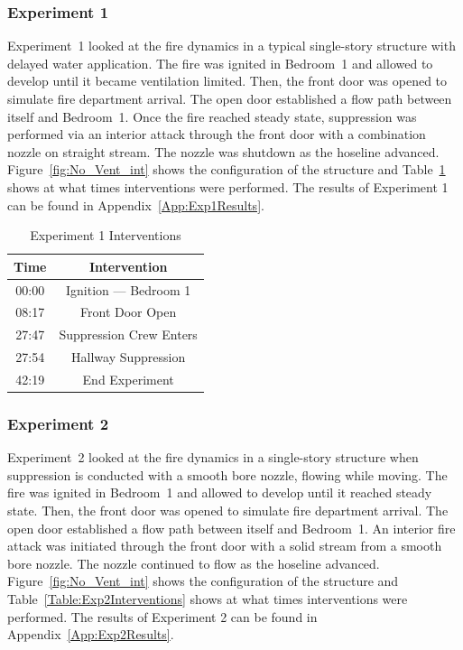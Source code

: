 \documentclass[12pt,oneside]{book}
\begin{document}
\subsubsection{Experiment 1}
Experiment~1 looked at the fire dynamics in a typical single-story structure with delayed water application. The fire was ignited in Bedroom~1 and allowed to develop until it became ventilation limited. Then, the front door was opened to simulate fire department arrival. The open door established a flow path between itself and Bedroom~1. Once the fire reached steady state, suppression was performed via an interior attack through the front door with a combination nozzle on straight stream. The nozzle was shutdown as the hoseline advanced. Figure~\ref{fig:No_Vent_int} shows the configuration of the structure and Table~\ref{Table:Exp1Interventions} shows at what times interventions were performed. The results of Experiment 1 can be found in Appendix~\ref{App:Exp1Results}. 


\begin{table}[!ht]
	\centering
	\caption{Experiment 1 Interventions}
	\begin{tabular}{|c|c|} 
		\hline
		Time & Intervention \\ \hline \hline
		00:00 & Ignition --- Bedroom 1 \\ \hline
		08:17 & Front Door Open \\ \hline
		27:47 & Suppression Crew Enters\\ \hline
		27:54 & Hallway Suppression \\ \hline
		42:19 & End Experiment\\ \hline
	\end{tabular}
	\label{Table:Exp1Interventions}
\end{table}

\FloatBarrier

\subsubsection{Experiment 2}

Experiment~2 looked at the fire dynamics in a single-story structure when suppression is conducted with a smooth bore nozzle, flowing while moving. The fire was ignited in Bedroom~1 and allowed to develop until it reached steady state. Then, the front door was opened to simulate fire department arrival. The open door established a flow path between itself and Bedroom~1. An interior fire attack was initiated through the front door with a solid stream from a smooth bore nozzle. The nozzle continued to flow as the hoseline advanced. Figure~\ref{fig:No_Vent_int} shows the configuration of the structure and Table~\ref{Table:Exp2Interventions} shows at what times interventions were performed. The results of Experiment 2 can be found in Appendix~\ref{App:Exp2Results}. 
\end{document}
